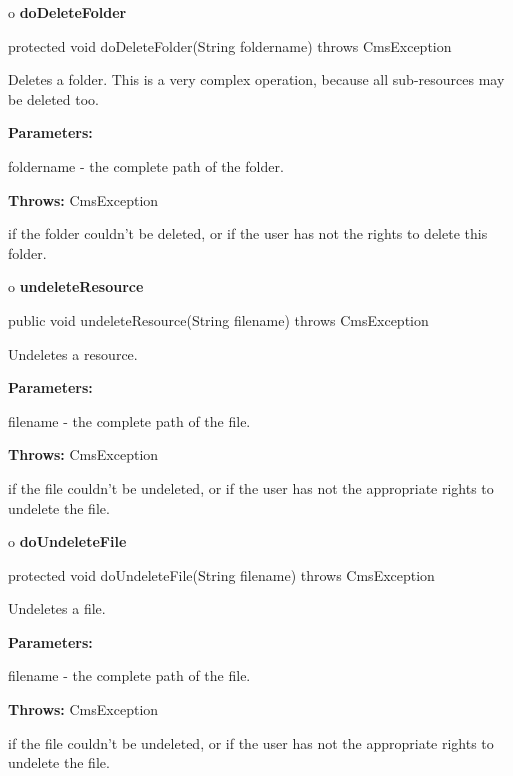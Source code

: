 o {\bf doDeleteFolder}

\begin{PRE}
 protected void doDeleteFolder(String foldername) throws CmsException
\end{PRE}

\begin{description}
\htmlDD Deletes a folder. \htmlBR
This is a very complex operation, because all sub-resources may be deleted
too.

\begin{description}
\item {\bf Parameters:}

foldername - the complete path of the folder.
\item {\bf Throws:} CmsException

if the folder couldn't be deleted, or if the user has not the rights to delete
this folder.
\end{description}

\end{description}

o {\bf undeleteResource}

\begin{PRE}
 public void undeleteResource(String filename) throws CmsException
\end{PRE}

\begin{description}
\htmlDD Undeletes a resource.

\begin{description}
\item {\bf Parameters:}

filename - the complete path of the file.
\item {\bf Throws:} CmsException

if the file couldn't be undeleted, or if the user has not the appropriate
rights to undelete the file.
\end{description}

\end{description}

o {\bf doUndeleteFile}

\begin{PRE}
 protected void doUndeleteFile(String filename) throws CmsException
\end{PRE}

\begin{description}
\htmlDD Undeletes a file.

\begin{description}
\item {\bf Parameters:}

filename - the complete path of the file.
\item {\bf Throws:} CmsException

if the file couldn't be undeleted, or if the user has not the appropriate
rights to undelete the file.
\end{description}

\end{description}

